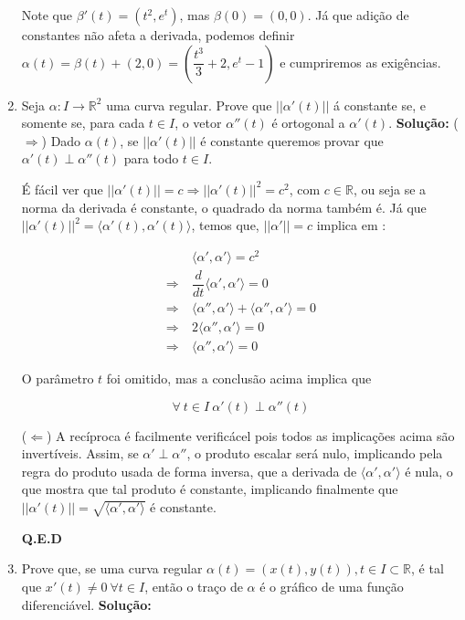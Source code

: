 \documentclass[12pt,letterpaper]{article}
\begin{document}
\begin{enumerate}
		Note que $\beta'(t)=(t^2 , e^t)$, mas $\beta(0)=(0,0)$. Já que adição de constantes não afeta a derivada, podemos definir $\alpha(t)=\beta(t)+(2,0)=\left(\dfrac{t^3}3+2,e^t-1\right)$ e cumpriremos as exigências.
		
		\item Seja $\alpha : I \to \mathbb{R}^2$ uma curva regular. Prove que $||\alpha'(t)||$ á constante se, e somente se,
		para cada $t \in I$, o vetor $\alpha'' (t)$ é ortogonal a $\alpha'(t)$.
		\subitem \textbf{Solução:} ($\Longrightarrow$) Dado $\alpha(t)$, se $||\alpha'(t)||$ é constante queremos provar que $\alpha' (t)\perp\alpha'' (t)$ para todo $t\in I$.
		
		É fácil ver que $||\alpha'(t)||=c\Rightarrow||\alpha'(t)||^2=c^2$, com $c\in\mathbb{R}$, ou seja se a norma da derivada é constante, o quadrado da norma também é. Já que $||\alpha'(t)||^2=\langle\alpha'(t),\alpha'(t)\rangle$, temos que, $||\alpha'||=c$ implica em :
		
		\begin{align*}
		&~\langle\alpha',\alpha'\rangle=c^2\\\Rightarrow&~
		\dfrac{d}{dt}\langle\alpha',\alpha'\rangle=0\\\Rightarrow&~
		\langle\alpha'',\alpha'\rangle+\langle\alpha'',\alpha'\rangle=0\\\Rightarrow&~
		2\langle\alpha'',\alpha'\rangle=0\\\Rightarrow&~
		\langle\alpha'',\alpha'\rangle=0
		\end{align*}
		
		O parâmetro $t$ foi omitido, mas a conclusão acima implica que 
		
		$$\forall ~t \in I~\alpha' (t)\perp\alpha'' (t)$$
		
		($\Longleftarrow$) A recíproca é facilmente verificácel pois todos as implicações acima são invertíveis. Assim, se $\alpha'\perp\alpha''$, o produto escalar será nulo, implicando pela regra do produto usada de forma inversa, que a derivada de  $\langle\alpha',\alpha'\rangle$ é nula, o que mostra que tal produto é constante, implicando finalmente que $||\alpha'(t)||=\sqrt{\langle\alpha',\alpha'\rangle}$ é constante. 
		\begin{flushright}
			\textbf{Q.E.D}
		\end{flushright}
		
		\item Prove que, se uma curva regular $\alpha(t) = (x(t), y(t)), t \in I \subset \mathbb{R}$, é tal que $x'(t) \neq  0~\forall t \in I$,	então o traço de $\alpha$ é o gráfico de uma função diferenciável.
		\subitem \textbf{Solução:}
		

\end{enumerate}
\end{document}

